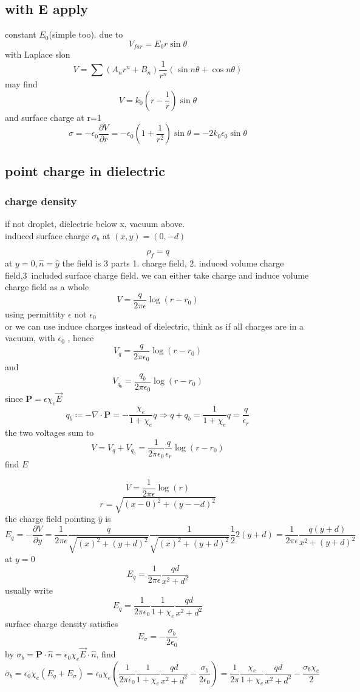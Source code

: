 \subsection{with E apply}
constant $E_0$(simple too).
due to
\[
    V_{far}=E_0 r \sin{\theta}
\]
with Laplace slon \[V = \sum (A_n r^n+B_n) \frac{1}{r^n}(\sin{n\theta}+\cos{n\theta})\]
may find
\[
    V=k_0 (r-\frac{1}{r})\sin{\theta}
\]
and surface charge at r=1
\[
\sigma=-\epsilon_0\frac{\partial V}{\partial r}=-\epsilon_0 (1+\frac{1}{r^2})\sin{\theta}=-2k_0\epsilon_0\sin{\theta}
\]

\subsection{point charge in dielectric}
\subsubsection{charge density}
if not droplet, dielectric below x, vacuum above.\\
induced surface charge $\sigma_b$ at $(x,y)=(0, -d)$

\[\rho_f = q
\]
at $y=0, \hat{n}=\hat{y}$
the field is 3 parts
1. charge field, 2. induced volume charge field,3\ included surface charge field.
we can either take charge and induce volume charge field as a whole
\[V=\frac{q}{2\pi\epsilon} \log(r-r_0)\]
using permittity $\epsilon$ not $\epsilon_0$\\
or we can use induce charges instead of dielectric, think as if all charges are in a vacuum, with $\epsilon_0$
, hence 
\[V_{q}=\frac{q}{2\pi\epsilon_0} \log(r-r_0)\]
and
\[V_{q_b}=\frac{q_b}{2\pi\epsilon_0} \log(r-r_0)\]
since $\mathbf{P}=\epsilon\chi_e \vec{E}$
\[q_b\coloneqq-\nabla\cdot\mathbf{P}=-\frac{\chi_e}{1+\chi_e}q\Longrightarrow q+q_b=\frac{1}{1+\chi_e}q=\frac{q}{\epsilon_r}
\]
the two voltages sum to
\[
V=V_q+V_{q_b}=\frac{1}{2\pi\epsilon_0}\frac{q}{\epsilon_r}\log (r-r_0)
\]
find $E$

\[V=\frac{1}{2\pi\epsilon}\log(r)\]
\[
r=\sqrt{(x-0)^2+(y--d)^2}
\]
the charge field pointing $\hat{y}$ is
\[
E_q=-\frac{\partial V}{\partial y}=\frac{1}{2\pi\epsilon}\frac{q}{\sqrt{(x)^2+(y+d)^2}}\frac{1}{\sqrt{(x)^2+(y+d)^2}}\frac{1}{2}2(y+d)=\frac{1}{2\pi\epsilon}\frac{q(y+d)}{x^2+(y+d)^2}
\]
at $y=0$
\[
E_q=\frac{1}{2\pi\epsilon}\frac{qd}{x^2+d^2}
\]
usually write
\[
E_q=\frac{1}{2\pi\epsilon_0}\frac{1}{1+\chi_e}\frac{qd}{x^2+d^2}
\]
surface charge density satisfies
\[
E_\sigma=-\frac{\sigma_b}{2\epsilon_0}
\]
by $\sigma_b=\mathbf{P}\cdot\hat{n}=\epsilon_0\chi_e\vec{E}\cdot\hat{n}$, find
\[
\sigma_b=\epsilon_0\chi_e\left(E_q+E_{\sigma}\right)=\epsilon_0\chi_e\left(\frac{1}{2\pi\epsilon_0}\frac{1}{1+\chi_e}\frac{qd}{x^2+d^2}-\frac{\sigma_b}{2\epsilon_0}\right)=\frac{1}{2\pi}\frac{\chi_e}{1+\chi_e}\frac{qd}{x^2+d^2}-\frac{\sigma_b \chi_e}{2}
\]

